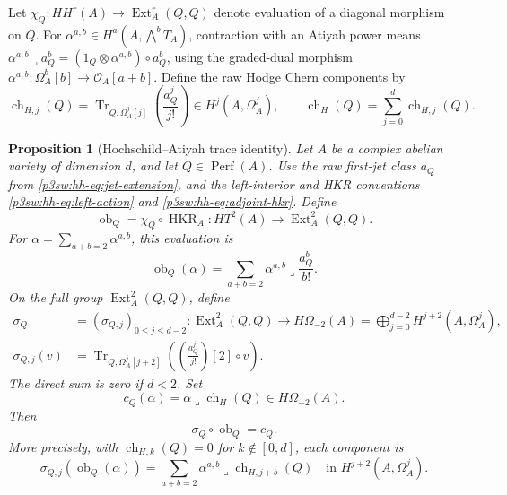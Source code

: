 \documentclass[11pt]{article}
\newtheorem{proposition}[theorem]{Proposition}
\numberwithin{equation}{section}
\begin{document}
Let \(\chi_Q:HH^r(A)\to\operatorname{Ext}^r_A(Q,Q)\) denote
evaluation of a diagonal morphism on \(Q\).
For \(\alpha^{a,b}\in H^a(A,\bigwedge^bT_A)\), contraction with an
Atiyah power means
\(\alpha^{a,b}\mathbin{\lrcorner}a_Q^b
=(1_Q\otimes\alpha^{a,b})\circ a_Q^b\), using the graded-dual morphism
\(\alpha^{a,b}:\Omega_A^b[b]\to\mathcal O_A[a+b]\).
Define the raw Hodge Chern components by
\begin{equation}
 \operatorname{ch}_{H,j}(Q)
      =\operatorname{Tr}_{Q,\Omega_A^j[j]}
                      \left(\frac{a_Q^j}{j!}\right)
         \in H^j(A,\Omega_A^j),\qquad
 \operatorname{ch}_H(Q)=\sum_{j=0}^d\operatorname{ch}_{H,j}(Q).
\label{p3sw:hh-eq:hodge-character}
\end{equation}

\begin{proposition}[Hochschild--Atiyah trace identity]
\label{p3sw:hh-triangle}
Let \(A\) be a complex abelian variety of dimension \(d\), and let
\(Q\in\operatorname{Perf}(A)\).  Use the raw first-jet class \(a_Q\)
from \eqref{p3sw:hh-eq:jet-extension}, and the left-interior and HKR
conventions \eqref{p3sw:hh-eq:left-action} and
\eqref{p3sw:hh-eq:adjoint-hkr}.  Define
\[
 \operatorname{ob}_Q=\chi_Q\circ\operatorname{HKR}_A:
       HT^2(A)\longrightarrow\operatorname{Ext}^2_A(Q,Q).
\]
For \(\alpha=\sum_{a+b=2}\alpha^{a,b}\), this evaluation is
\[
 \operatorname{ob}_Q(\alpha)
       =\sum_{a+b=2}\alpha^{a,b}\mathbin{\lrcorner}
                                      \frac{a_Q^b}{b!}.
\]
On the full group \(\operatorname{Ext}^2_A(Q,Q)\), define
\begin{equation}
\begin{split}
 \sigma_Q&=(\sigma_{Q,j})_{0\leq j\leq d-2}:
   \operatorname{Ext}^2_A(Q,Q)
       \longrightarrow H\Omega_{-2}(A)
          =\bigoplus_{j=0}^{d-2}H^{j+2}(A,\Omega_A^j),\\
 \sigma_{Q,j}(v)&=
   \operatorname{Tr}_{Q,\Omega_A^j[j+2]}
        \left(\left(\frac{a_Q^j}{j!}\right)[2]\circ v\right).
\end{split}
\label{p3sw:hh-eq:sigma}
\end{equation}
The direct sum is zero if \(d<2\).  Set
\[
 c_Q(\alpha)=\alpha\mathbin{\lrcorner}\operatorname{ch}_H(Q)
       \in H\Omega_{-2}(A).
\]
Then
\begin{equation}
 \sigma_Q\circ\operatorname{ob}_Q=c_Q.
\label{p3sw:hh-eq:triangle}
\end{equation}
More precisely, with
\(\operatorname{ch}_{H,k}(Q)=0\) for \(k\notin[0,d]\), each component
is
\begin{equation}
 \sigma_{Q,j}(\operatorname{ob}_Q(\alpha))
    =\sum_{a+b=2}\alpha^{a,b}\mathbin{\lrcorner}
                          \operatorname{ch}_{H,j+b}(Q)
       \quad\text{in }H^{j+2}(A,\Omega_A^j).
\label{p3sw:hh-eq:triangle-components}
\end{equation}
\end{proposition}
\end{document}
